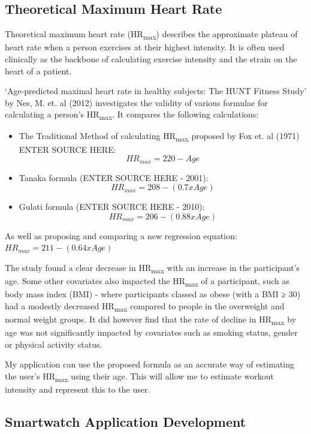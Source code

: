 \documentclass{l4proj}
\begin{document}
\subsection{Theoretical Maximum Heart Rate}

Theoretical maximum heart rate (HR\textsubscript{max}) describes the approximate plateau of heart rate when a person exercises at their highest intensity. It is often used clinically as the backbone of calculating exercise intensity and the strain on the heart of a patient. 

‘Age-predicted maximal heart rate in healthy subjects: The HUNT Fitness Study’ by Nes, M. et. al (2012) investigates the validity of various formulae for calculating a person’s HR\textsubscript{max}. It compares the following calculations:

\begin{itemize}
    \item The Traditional Method of calculating HR\textsubscript{max} proposed by Fox et. al (1971) ENTER SOURCE HERE: $$HR_{max} = 220 - Age$$
    \item Tanaka formula (ENTER SOURCE HERE - 2001): $$HR_{max} = 208 - (0.7 x Age)$$
    \item Gulati formula (ENTER SOURCE HERE - 2010): $$HR_{max} = 206 - (0.88 x Age)$$
\end{itemize}

As well as proposing and comparing a new regression equation: $HR_{max} = 211 - (0.64 x Age)$

The study found a clear decrease in HR\textsubscript{max} with an increase in the participant’s age. Some other covariates also impacted the HR\textsubscript{max} of a participant, such as body mass index (BMI) - where participants classed as obese (with a BMI ≥ 30) had a modestly decreased HR\textsubscript{max} compared to people in the overweight and normal weight groups. It did however find that the rate of decline in HR\textsubscript{max} by age was not significantly impacted by covariates such as smoking status, gender or physical activity status.

My application can use the proposed formula as an accurate way of estimating the user's HR\textsubscript{max} using their age. This will allow me to estimate workout intensity and represent this to the user.


\subsection{Smartwatch Application Development}
\end{document}
